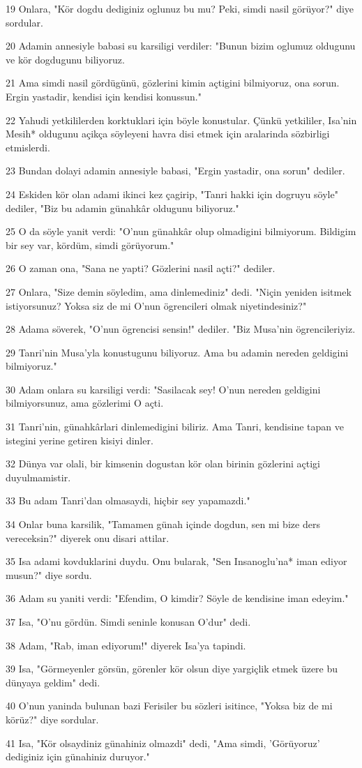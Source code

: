 \par 19 Onlara, "Kör dogdu dediginiz oglunuz bu mu? Peki, simdi nasil görüyor?" diye sordular.
\par 20 Adamin annesiyle babasi su karsiligi verdiler: "Bunun bizim oglumuz oldugunu ve kör dogdugunu biliyoruz.
\par 21 Ama simdi nasil gördügünü, gözlerini kimin açtigini bilmiyoruz, ona sorun. Ergin yastadir, kendisi için kendisi konussun."
\par 22 Yahudi yetkililerden korktuklari için böyle konustular. Çünkü yetkililer, Isa'nin Mesih* oldugunu açikça söyleyeni havra disi etmek için aralarinda sözbirligi etmislerdi.
\par 23 Bundan dolayi adamin annesiyle babasi, "Ergin yastadir, ona sorun" dediler.
\par 24 Eskiden kör olan adami ikinci kez çagirip, "Tanri hakki için dogruyu söyle" dediler, "Biz bu adamin günahkâr oldugunu biliyoruz."
\par 25 O da söyle yanit verdi: "O'nun günahkâr olup olmadigini bilmiyorum. Bildigim bir sey var, kördüm, simdi görüyorum."
\par 26 O zaman ona, "Sana ne yapti? Gözlerini nasil açti?" dediler.
\par 27 Onlara, "Size demin söyledim, ama dinlemediniz" dedi. "Niçin yeniden isitmek istiyorsunuz? Yoksa siz de mi O'nun ögrencileri olmak niyetindesiniz?"
\par 28 Adama söverek, "O'nun ögrencisi sensin!" dediler. "Biz Musa'nin ögrencileriyiz.
\par 29 Tanri'nin Musa'yla konustugunu biliyoruz. Ama bu adamin nereden geldigini bilmiyoruz."
\par 30 Adam onlara su karsiligi verdi: "Sasilacak sey! O'nun nereden geldigini bilmiyorsunuz, ama gözlerimi O açti.
\par 31 Tanri'nin, günahkârlari dinlemedigini biliriz. Ama Tanri, kendisine tapan ve istegini yerine getiren kisiyi dinler.
\par 32 Dünya var olali, bir kimsenin dogustan kör olan birinin gözlerini açtigi duyulmamistir.
\par 33 Bu adam Tanri'dan olmasaydi, hiçbir sey yapamazdi."
\par 34 Onlar buna karsilik, "Tamamen günah içinde dogdun, sen mi bize ders vereceksin?" diyerek onu disari attilar.
\par 35 Isa adami kovduklarini duydu. Onu bularak, "Sen Insanoglu'na* iman ediyor musun?" diye sordu.
\par 36 Adam su yaniti verdi: "Efendim, O kimdir? Söyle de kendisine iman edeyim."
\par 37 Isa, "O'nu gördün. Simdi seninle konusan O'dur" dedi.
\par 38 Adam, "Rab, iman ediyorum!" diyerek Isa'ya tapindi.
\par 39 Isa, "Görmeyenler görsün, görenler kör olsun diye yargiçlik etmek üzere bu dünyaya geldim" dedi.
\par 40 O'nun yaninda bulunan bazi Ferisiler bu sözleri isitince, "Yoksa biz de mi körüz?" diye sordular.
\par 41 Isa, "Kör olsaydiniz günahiniz olmazdi" dedi, "Ama simdi, 'Görüyoruz' dediginiz için günahiniz duruyor."

